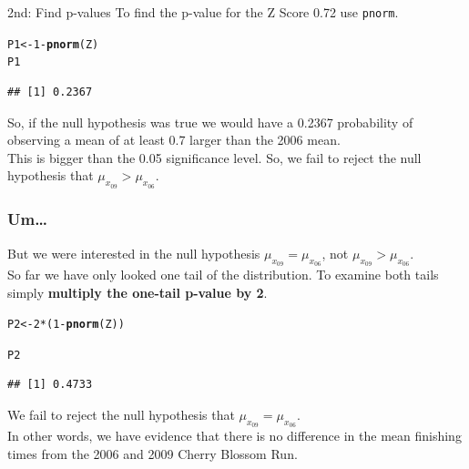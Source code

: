 \documentclass{beamer}\usepackage{graphicx, color}
\makeatletter
\newcommand{\hlfunctioncall}[1]{\textcolor[rgb]{0.501960784313725,0,0.329411764705882}{\textbf{#1}}}%
\newenvironment{kframe}{%
 \def\at@end@of@kframe{}%
 \ifinner\ifhmode%
  \def\at@end@of@kframe{\end{minipage}}%
  \begin{minipage}{\columnwidth}%
 \fi\fi%
 \def\FrameCommand##1{\hskip\@totalleftmargin \hskip-\fboxsep
 \colorbox{shadecolor}{##1}\hskip-\fboxsep
     \hskip-\linewidth \hskip-\@totalleftmargin \hskip\columnwidth}%
 \MakeFramed {\advance\hsize-\width
   \@totalleftmargin\z@ \linewidth\hsize
   \@setminipage}}%
 {\par\unskip\endMakeFramed%
 \at@end@of@kframe}
\newenvironment{knitrout}{}{} %
\makeatother
\begin{document}
\begin{frame}[fragile]
{\LARGE{2nd: Find p-values}}
  To find the p-value for the $\mathrm{Z}$ Score 0.72 use \texttt{pnorm}.
\begin{knitrout}
\color{fgcolor}\begin{kframe}
\begin{alltt}
P1 <- 1 - \hlfunctioncall{pnorm}(Z)
P1
\end{alltt}
\begin{verbatim}
## [1] 0.2367
\end{verbatim}
\end{kframe}
\end{knitrout}

So, if the null hypothesis was true we would have a 0.2367 probability of observing a mean of at least 0.7 larger than the 2006 mean. \\[0.25cm]
This is bigger than the 0.05 significance level. So, we fail to reject the null hypothesis that $\mu_{{x}_{09}} > \mu_{{x}_{06}}$.
\end{frame}

\begin{frame}[fragile]
  \frametitle{Um\ldots}
  But we were interested in the null hypothesis $\mu_{{x}_{09}} = \mu_{{x}_{06}}$, not $\mu_{{x}_{09}} > \mu_{{x}_{06}}$. \\[0.5cm]
  So far we have only looked one tail of the distribution. To examine both tails simply {\bf{multiply the one-tail p-value by 2}}.
\begin{knitrout}
\color{fgcolor}\begin{kframe}
\begin{alltt}
P2 <- 2 * (1 - \hlfunctioncall{pnorm}(Z))

P2
\end{alltt}
\begin{verbatim}
## [1] 0.4733
\end{verbatim}
\end{kframe}
\end{knitrout}

We fail to reject the null hypothesis that $\mu_{{x}_{09}} = \mu_{{x}_{06}}$. \\[0.25cm]
In other words, we have evidence that there is no difference in the mean finishing times from the 2006 and 2009 Cherry Blossom Run.

\end{frame}
\end{document}
